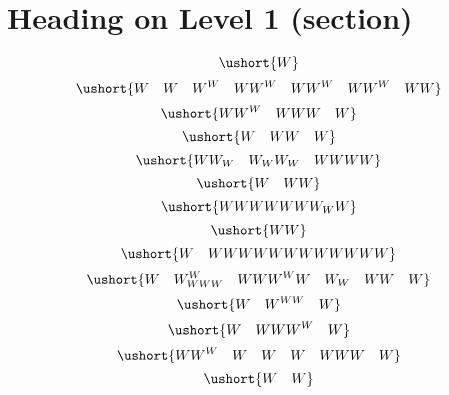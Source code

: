 \documentclass[12pt]{article}
\begin{document}
\section{Heading on Level 1 (section)}
\color{red}\[\ushort{W}\]
\color{lime}\[\ushort{W \quad W \quad W^{W} \quad WW^{W} \quad WW^{W} \quad WW^{W} \quad WW}\]
\color{cyan}\[\ushort{WW^{W} \quad WWW \quad W}\]
\color{red}\[\ushort{W \quad WW \quad W}\]
\color{orange}\[\ushort{WW_{W} \quad W_{W}W_{W} \quad WWWW}\]
\color{lime}\[\ushort{W \quad WW}\]
\color{cyan}\[\ushort{WWWWWWW_{W}W}\]
\color{blue}\[\ushort{WW}\]
\color{red}\[\ushort{W \quad WWWWWWWWWWWW}\]
\color{orange}\[\ushort{W \quad W^{W}_{WWW} \quad WWW^{W}W \quad W_{W} \quad WW \quad W}\]
\color{lime}\[\ushort{W \quad W^{WW} \quad W}\]
\color{cyan}\[\ushort{W \quad WWW^{W} \quad W}\]
\color{blue}\[\ushort{WW^{W} \quad W \quad W \quad W \quad WWW \quad W}\]
\color{orange}\[\ushort{W \quad W}\]
\end{document}
